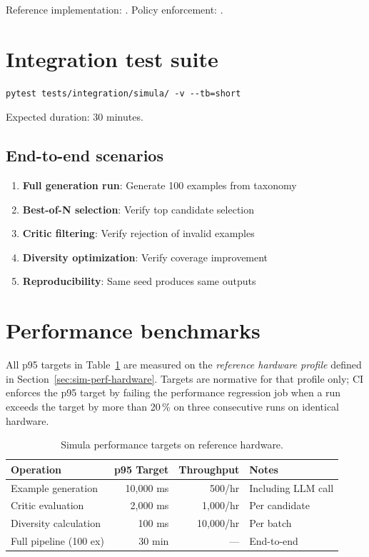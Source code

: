 \noindent
Reference implementation:
.
Policy enforcement: .

\section{Integration test suite}

\begin{lstlisting}[basicstyle=\ttfamily\small]
pytest tests/integration/simula/ -v --tb=short
\end{lstlisting}

Expected duration: 30 minutes.

\subsection{End-to-end scenarios}

\begin{enumerate}
  \item \textbf{Full generation run}: Generate 100 examples from taxonomy
  \item \textbf{Best-of-N selection}: Verify top candidate selection
  \item \textbf{Critic filtering}: Verify rejection of invalid examples
  \item \textbf{Diversity optimization}: Verify coverage improvement
  \item \textbf{Reproducibility}: Same seed produces same outputs
\end{enumerate}

\section{Performance benchmarks}

All p95 targets in Table~\ref{tab:sim-perf-targets} are measured on the
\emph{reference hardware profile} defined in
Section~\ref{sec:sim-perf-hardware}. Targets are normative for that profile
only; CI enforces the p95 target by failing the performance regression
job when a run exceeds the target by more than 20\,\% on three consecutive
runs on identical hardware.

\begin{table}[htbp]
\centering
\caption{Simula performance targets on reference hardware.}
\label{tab:sim-perf-targets}
\footnotesize
\begin{tabularx}{\linewidth}{@{}l r r X@{}}
\toprule
\textbf{Operation} & \textbf{p95 Target} & \textbf{Throughput} & \textbf{Notes} \\ \midrule
Example generation & 10,000 ms & 500/hr & Including LLM call \\
Critic evaluation & 2,000 ms & 1,000/hr & Per candidate \\
Diversity calculation & 100 ms & 10,000/hr & Per batch \\
Full pipeline (100 ex) & 30 min & --- & End-to-end \\
\bottomrule
\end{tabularx}
\end{table}

